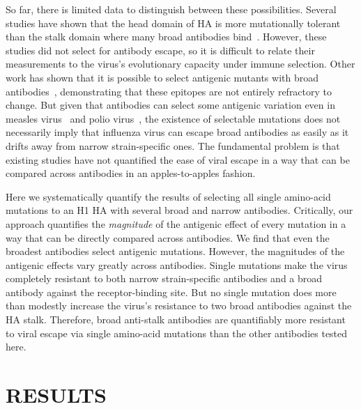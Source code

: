 \documentclass[11pt]{article}
\begin{document}
So far, there is limited data to distinguish between these possibilities.
Several studies have shown that the head domain of HA is more mutationally tolerant than the stalk domain where many broad antibodies bind~\citep{thyagarajan2014inherent,wu2014high,heaton2013genome}.
However, these studies did not select for antibody escape, so it is difficult to relate their measurements to the virus's evolutionary capacity under immune selection.
Other work has shown that it is possible to select antigenic mutants with broad antibodies~\citep{yoshida2009cross,chai2016two}, demonstrating that these epitopes are not entirely refractory to change.
But given that antibodies can select some antigenic variation even in measles virus~\citep{birrer1981antigenic,ter1981antigenic} and polio virus~\citep{crainic1983natural,diamond1985antigenic}, the existence of selectable mutations does not necessarily imply that influenza virus can escape broad antibodies as easily as it drifts away from narrow strain-specific ones.
The fundamental problem is that existing studies have not quantified the ease of viral escape in a way that can be compared across antibodies in an apples-to-apples fashion.

Here we systematically quantify the results of selecting all single amino-acid mutations to an H1 HA with several broad and narrow antibodies.
Critically, our approach quantifies the \emph{magnitude} of the antigenic effect of every mutation in a way that can be directly compared across antibodies.
We find that even the broadest antibodies select antigenic mutations.
However, the magnitudes of the antigenic effects vary greatly across antibodies.
Single mutations make the virus completely resistant to both narrow strain-specific antibodies and a broad antibody against the receptor-binding site.
But no single mutation does more than modestly increase the virus's resistance to two broad antibodies against the HA stalk.
Therefore, broad anti-stalk antibodies are quantifiably more resistant to viral escape via single amino-acid mutations than the other antibodies tested here. 


\section*{RESULTS}
\label{sec:results}
\end{document}

